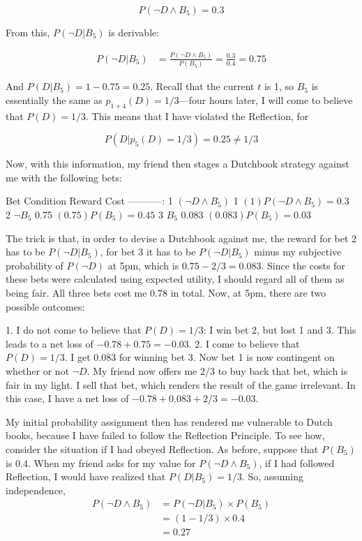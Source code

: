\[P(\neg D \wedge B_{5} ) = 0.3\]

From this, \(P(\neg D|B_5)\) is derivable:

\[\begin{aligned}
P(\neg D|B_5) &= \frac{P(\neg D \wedge B_5)}{P(B_5)}= \frac{0.3}{0.4}=0.75\end{aligned}\]

And \(P(D|B_5) = 1 - 0.75 = 0.25\). Recall that the current \(t\) is 1,
so \(B_5\) is essentially the same as \(p_{1+4}(D) = 1/3\)---four hours
later, I will come to believe that \(P(D)=1/3\). This means that I have
violated the Reflection, for

\[P(D|p_{5}(D) = 1/3)=0.25 \neq 1/3\]

Now, with this information, my friend then stages a Dutchbook strategy
against me with the following bets:

\textbar{} Bet \textbar{}Condition \textbar{}Reward \textbar{} Cost
\textbar{}
\textbar{}---\textbar{}---\textbar{}---\textbar{}--:\textbar{}
\textbar{} 1 \textbar{} \((\neg D \wedge B_5)\) \textbar{} 1 \textbar{}
\((1)P(\neg D \wedge B_5) =0.3\) \textbar{} \textbar{} 2 \textbar{}
\(\neg B_5\)\textbar{} 0.75 \textbar{} \((0.75)P(B_5)=0.45\) \textbar{}
\textbar{} 3 \textbar{} \(B_5\) \textbar{} 0.083 \textbar{}
\((0.083)P(B_5) = 0.03\) \textbar{}

The trick is that, in order to devise a Dutchbook against me, the reward
for bet 2 has to be \(P(\neg D | B_5)\), for bet 3 it has to be
\(P(\neg D | B_5)\) minus my subjective probability of \(P(\neg D)\) at
5pm, which is \(0.75-2/3= 0.083\). Since the costs for these bets were
calculated using expected utility, I should regard all of them as being
fair. All three bets cost me \(0.78\) in total. Now, at 5pm, there are
two possible outcomes:

1. I do not come to believe that \(P(D) = 1/3\): I win bet 2, but lost 1
and 3. This leads to a net loss of \(-0.78 + 0.75 = -0.03\). 2. I come
to believe that \(P(D) = 1/3\). I get \(0.083\) for winning bet 3. Now
bet 1 is now contingent on whether or not \(\neg D\). My friend now
offers me \(2/3\) to buy back that bet, which is fair in my light. I
sell that bet, which renders the result of the game irrelevant. In this
case, I have a net loss of \(-0.78+0.083+2/3 = -0.03\).

My initial probability assignment then has rendered me vulnerable to
Dutch books, because I have failed to follow the Reflection Principle.
To see how, consider the situation if I had obeyed Reflection. As
before, suppose that \(P(B_5)\) is 0.4. When my friend asks for my value
for \(P(\neg D \wedge B_5)\), if I had followed Reflection, I would have
realized that \(P(D|B_5)=1/3\). So, assuming independence,
\[\begin{aligned}
P(\neg D \wedge B_5) &= P(\neg D |B_5)\times P(B_5)\\
&= (1-1/3) \times 0.4\\
&= 0.27\end{aligned}\]


